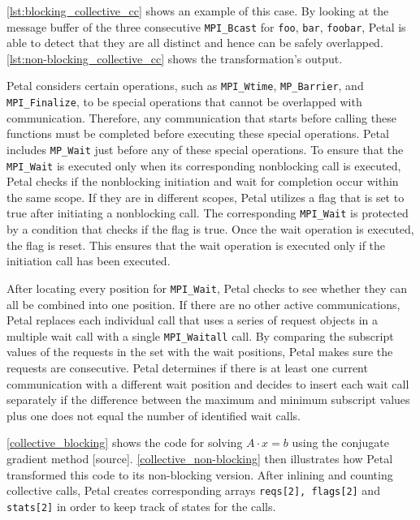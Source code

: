 

\autoref{lst:blocking_collective_cc} shows an example of this case. 
By looking at the message buffer of the three consecutive \texttt{MPI\_Bcast} for \texttt{foo}, \texttt{bar}, \texttt{foobar}, Petal is able to detect that they are all distinct and hence can be safely overlapped. 
\autoref{lst:non-blocking_collective_cc} shows the transformation's output.



Petal considers certain operations, such as \texttt{MPI\_Wtime}, \texttt{MP\_Barrier}, and \texttt{MPI\_Finalize}, to be special operations that cannot be overlapped with communication. 
Therefore, any communication that starts before calling these functions must be completed before executing these special operations. 
Petal includes \texttt{MP\_Wait} just before any of these special operations. 
To ensure that the \texttt{MPI\_Wait} is executed only when its corresponding nonblocking call is executed, Petal checks if the nonblocking initiation and wait for completion occur within the same scope. 
If they are in different scopes, Petal utilizes a flag that is set to true after initiating a nonblocking call. 
The corresponding \texttt{MPI\_Wait} is protected by a condition that checks if the flag is true. 
Once the wait operation is executed, the flag is reset. This ensures that the wait operation is executed only if the initiation call has been executed.

After locating every position for \texttt{MPI\_Wait}, Petal checks to see whether they can all be combined into one position. 
If there are no other active communications, Petal replaces each individual call that uses a series of request objects in a multiple wait call with a single 
\texttt{MPI\_Waitall} call. By comparing the subscript values of the requests in the set with the wait positions, Petal makes sure the requests are consecutive. 
Petal determines if there is at least one current communication with a different wait position and decides to insert each wait call separately if the difference between the maximum and minimum subscript values plus one does not equal the number of identified wait calls.

\autoref{collective_blocking} shows the code for solving $A \cdot x = b$ using the conjugate gradient method [source]. \autoref{collective_non-blocking} then illustrates how Petal transformed this code to its non-blocking version.
After inlining and counting collective calls, Petal creates corresponding arrays \texttt{reqs[2], flags[2]} and \texttt{stats[2]} in order to keep track of states for the calls. 

